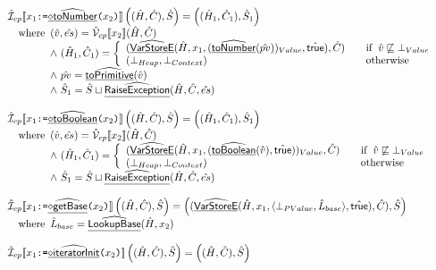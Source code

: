 \documentclass{article}
\newcommand{\SF}[1]{\mbox{\textsf{#1}}}
\newcommand{\TT}[1]{\mbox{\texttt{#1}}}
\newcommand{\wherec}[1]{{\rm where}\begin{array}[t]{l}#1\end{array}}
\newcommand{\ifc}[1]{{\rm if}\begin{array}[t]{l}#1\end{array}}
\newcommand{\owc}{{\rm otherwise}}
\newcommand{\aI}{\hat{\mathcal{I}}}
\newcommand{\aV}{\hat{\mathcal{V}}}
\newcommand{\lbr}{\llbracket}
\newcommand{\rbr}{\rrbracket}
\newcommand{\ahf}[1]{\widehat{\underline{\sf #1}}}
\newcommand{\ahfi}[1]{\ahf{\ensuremath{\diamond}#1}}
\newcommand{\atrue}{\hat{\SF{true}}}
\begin{document}
\[
\begin{array}{ll}
\aI_{cp}\lbr x_1 \TT{:=} \ahfi{toNumber}\TT{(}x_2\TT{)} \rbr \left((\hat{H},\hat{C}),\hat{S}\right)
= \left((\hat{H}_1,\hat{C}_1),\hat{S}_1\right)
\\\quad\wherec{
  (\hat{v},\hat{es}) = \aV_{cp}\lbr x_2\rbr(\hat{H},\hat{C})\\
  \land\ (\hat{H}_1, \hat{C}_1) = \left\{
     \begin{array}{ll}
       (\ahf{VarStoreE}(\hat{H},x_1,(\ahf{toNumber}(\hat{pv}))_{Value},\atrue), \hat{C})
       & \quad\ifc{\hat{v}\not\sqsubseteq\bot_{Value}} \\
       (\bot_{Heap}, \bot_{Context}) & \quad\owc
     \end{array}\right.\\
  \land\ \hat{pv}=\ahf{toPrimitive}(\hat{v})\\
  \land\ \hat{S}_1 = \hat{S}\sqcup\ahf{RaiseException}(\hat{H},\hat{C}, \hat{es})
}\\\\

\aI_{cp}\lbr x_1 \TT{:=} \ahfi{toBoolean}\TT{(}x_2\TT{)} \rbr \left((\hat{H},\hat{C}),\hat{S}\right)
= \left((\hat{H}_1,\hat{C}_1),\hat{S}_1\right)
\\\quad\wherec{
  (\hat{v},\hat{es}) = \aV_{cp}\lbr x_2\rbr(\hat{H},\hat{C})\\
  \land\ (\hat{H}_1, \hat{C}_1) = \left\{
     \begin{array}{ll}
       (\ahf{VarStoreE}(\hat{H},x_1,(\ahf{toBoolean}(\hat{v}),\atrue))_{Value},\hat{C})
       & \quad\ifc{\hat{v}\not\sqsubseteq\bot_{Value}} \\
       (\bot_{Heap}, \bot_{Context}) & \quad\owc
     \end{array}\right.\\
  \land\ \hat{S}_1 = \hat{S}\sqcup\ahf{RaiseException}(\hat{H},\hat{C}, \hat{es})
}
\\\\

\aI_{cp}\lbr x_1 \TT{:=} \ahfi{getBase}\TT{(}x_2\TT{)} \rbr \left((\hat{H},\hat{C}),\hat{S}\right)
 = \left((\ahf{VarStoreE}(\hat{H},x_1,\langle\bot_{PValue},\hat{L}_{base}\rangle,\atrue),\hat{C}),\hat{S}\right) \\
\quad\wherec{
  \hat{L}_{base}=\ahf{LookupBase}(\hat{H},x_2)
}
\\\\

\aI _{cp}\lbr x_1 \TT{:=} \ahfi{iteratorInit}\TT{(}x_2\TT{)} \rbr \left((\hat{H},\hat{C}),\hat{S}\right)
 = \left((\hat{H}, \hat{C}),\hat{S}\right)
\\\\


\end{array}\]
\end{document}

